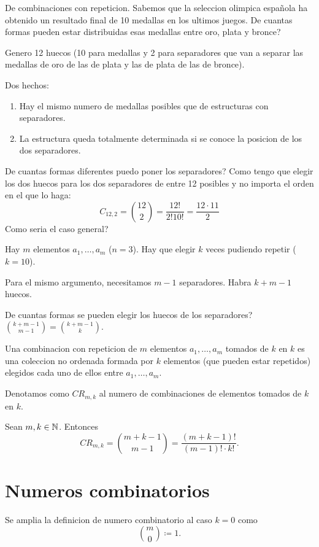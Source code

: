 \begin{example}
	De combinaciones con repeticion. Sabemos que la seleccion olimpica española ha obtenido un resultado final de 10 medallas en los ultimos juegos. De cuantas formas pueden estar distribuidas esas medallas entre oro, plata y bronce?
	
	Genero 12 huecos (10 para medallas y 2 para separadores que van a separar las medallas de oro de las de plata y las de plata de las de bronce).
	
	Dos hechos:
	\begin{enumerate}
		\item Hay el mismo numero de medallas posibles que de estructuras con separadores.
		\item La estructura queda totalmente determinada si se conoce la posicion de los dos separadores.
	\end{enumerate}
	
	De cuantas formas diferentes puedo poner los separadores? Como tengo que elegir los dos huecos para los dos separadores de entre 12 posibles y no importa el orden en el que lo haga:
	\[
		C_{12,2} = \binom{12 }{2 } = \frac{12! }{2!10! } = \frac{12 \cdot 11 }{2}
	\]
	Como seria el caso general?
	
	Hay \(m \) elementos \(a_1, \ldots, a_m \) (\(n = 3 \)). Hay que elegir \(k \) veces pudiendo repetir (\(k = 10\)).
	
	Para el mismo argumento, necesitamos \(m - 1 \) separadores. Habra \(k + m - 1 \) huecos.
	
	De cuantas formas se pueden elegir los huecos de los separadores? \(\binom{k + m - 1}{m - 1 } = \binom{k + m - 1 }{k}\).
\end{example}

\begin{definition}
	Una combinacion con repeticion de \(m \) elementos \(a_1,\ldots,a_m \) tomados de \(k \) en \(k \) es una coleccion no ordenada formada por \(k \) elementos (que pueden estar repetidos) elegidos cada uno de ellos entre \(a_1,\ldots, a_m \).
	
	Denotamos como \(CR_{m,k}\) al numero de combinaciones de elementos tomados de \(k \) en \(k \).
\end{definition}

\begin{theorem}
	Sean \(m,k \in \mathbb{N} \). Entonces
	\[
		CR_{m,k} = \binom{m+k-1}{m-1} = \frac{(m+k-1)!}{(m-1)! \cdot k!}.
	\]
\end{theorem}

\section{Numeros combinatorios}
\begin{definition}
	Se amplia la definicion de numero combinatorio al caso \(k = 0 \) como
	\[
		\binom{m }{0 } \coloneqq 1.
	\]
\end{definition}

